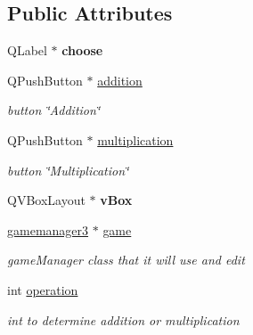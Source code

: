 \subsection*{\-Public \-Attributes}
\begin{DoxyCompactItemize}
\item 
\hypertarget{classmainmenu_aefa862e24332067075959a0f1097822a}{\-Q\-Label $\ast$ {\bfseries choose}}\label{classmainmenu_aefa862e24332067075959a0f1097822a}

\item 
\hypertarget{classmainmenu_aaefd3607900bba8c92ee9a3529dbf37b}{\-Q\-Push\-Button $\ast$ \hyperlink{classmainmenu_aaefd3607900bba8c92ee9a3529dbf37b}{addition}}\label{classmainmenu_aaefd3607900bba8c92ee9a3529dbf37b}

\begin{DoxyCompactList}\small\item\em button \char`\"{}\-Addition\char`\"{} \end{DoxyCompactList}\item 
\hypertarget{classmainmenu_aa227f55b300e88fef1eb05eff8f0b632}{\-Q\-Push\-Button $\ast$ \hyperlink{classmainmenu_aa227f55b300e88fef1eb05eff8f0b632}{multiplication}}\label{classmainmenu_aa227f55b300e88fef1eb05eff8f0b632}

\begin{DoxyCompactList}\small\item\em button \char`\"{}\-Multiplication\char`\"{} \end{DoxyCompactList}\item 
\hypertarget{classmainmenu_ade17cd29fd45c9ab3f7bf5cc6f0ca8d9}{\-Q\-V\-Box\-Layout $\ast$ {\bfseries v\-Box}}\label{classmainmenu_ade17cd29fd45c9ab3f7bf5cc6f0ca8d9}

\item 
\hypertarget{classmainmenu_a32ec24f59a4ea2f8b18218773a6740ef}{\hyperlink{classgamemanager3}{gamemanager3} $\ast$ \hyperlink{classmainmenu_a32ec24f59a4ea2f8b18218773a6740ef}{game}}\label{classmainmenu_a32ec24f59a4ea2f8b18218773a6740ef}

\begin{DoxyCompactList}\small\item\em game\-Manager class that it will use and edit \end{DoxyCompactList}\item 
\hypertarget{classmainmenu_afad9dee09a511f0032d653d51008662b}{int \hyperlink{classmainmenu_afad9dee09a511f0032d653d51008662b}{operation}}\label{classmainmenu_afad9dee09a511f0032d653d51008662b}

\begin{DoxyCompactList}\small\item\em int to determine addition or multiplication \end{DoxyCompactList}\end{DoxyCompactItemize}


